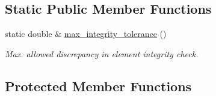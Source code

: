 \subsection*{Static Public Member Functions}
\begin{DoxyCompactItemize}
\item 
static double \& \hyperlink{classoomph_1_1RefineableElement_a25b5901fb0689aefe2c67c361f4290f2}{max\+\_\+integrity\+\_\+tolerance} ()
\begin{DoxyCompactList}\small\item\em Max. allowed discrepancy in element integrity check. \end{DoxyCompactList}\end{DoxyCompactItemize}
\subsection*{Protected Member Functions}
